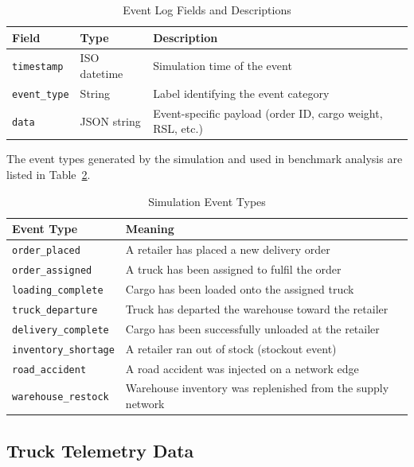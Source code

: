 \begin{table}[h!]
\centering
\caption{Event Log Fields and Descriptions}
\label{tab:event_fields}
\begin{tabular}{|l|l|l|}
\hline
\textbf{Field}       & \textbf{Type}   & \textbf{Description} \\
\hline
\texttt{timestamp}   & ISO datetime    & Simulation time of the event \\
\hline
\texttt{event\_type} & String          & Label identifying the event category \\
\hline
\texttt{data}        & JSON string     & Event-specific payload (order ID, cargo weight, RSL, etc.) \\
\hline
\end{tabular}
\end{table}

The event types generated by the simulation and used in benchmark analysis are
listed in Table~\ref{tab:event_types}.

\begin{table}[h!]
\centering
\caption{Simulation Event Types}
\label{tab:event_types}
\begin{tabular}{|l|l|}
\hline
\textbf{Event Type}          & \textbf{Meaning} \\
\hline
\texttt{order\_placed}       & A retailer has placed a new delivery order \\
\hline
\texttt{order\_assigned}     & A truck has been assigned to fulfil the order \\
\hline
\texttt{loading\_complete}   & Cargo has been loaded onto the assigned truck \\
\hline
\texttt{truck\_departure}    & Truck has departed the warehouse toward the retailer \\
\hline
\texttt{delivery\_complete}  & Cargo has been successfully unloaded at the retailer \\
\hline
\texttt{inventory\_shortage} & A retailer ran out of stock (stockout event) \\
\hline
\texttt{road\_accident}      & A road accident was injected on a network edge \\
\hline
\texttt{warehouse\_restock}  & Warehouse inventory was replenished from the supply network \\
\hline
\end{tabular}
\end{table}

\subsection{Truck Telemetry Data}

